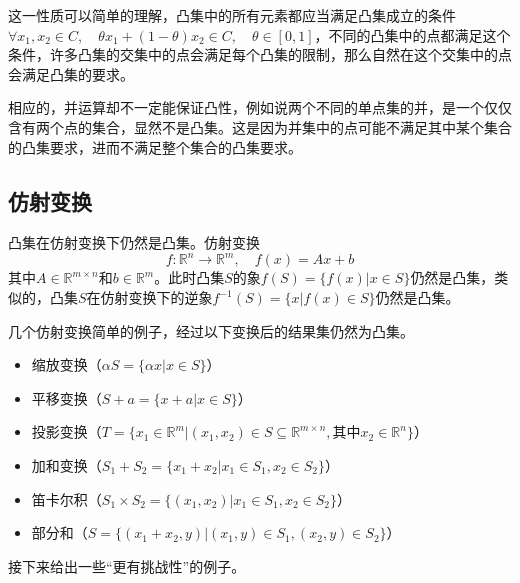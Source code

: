\documentclass[12pt,a4paper]{book}
\begin{document}
这一性质可以简单的理解，凸集中的所有元素都应当满足凸集成立的条件$\forall x_1,x_2 \in C,\quad\theta x_1 + (1 - \theta)x_2 \in C,\quad \theta \in [0,1]$，不同的凸集中的点都满足这个条件，许多凸集的交集中的点会满足每个凸集的限制，那么自然在这个交集中的点会满足凸集的要求。

相应的，并运算却不一定能保证凸性，例如说两个不同的单点集的并，是一个仅仅含有两个点的集合，显然不是凸集。这是因为并集中的点可能不满足其中某个集合的凸集要求，进而不满足整个集合的凸集要求。

\subsection{仿射变换}

凸集在仿射变换下仍然是凸集。仿射变换
$$f:\mathbb{R}^n\to\mathbb{R}^m,\quad f(x)=Ax+b$$
其中$A\in\mathbb{R}^{m \times n}$和$b\in\mathbb{R}^m$。此时凸集$S$的象$f(S) = \{f(x)|x\in S\}$仍然是凸集，类似的，凸集$S$在仿射变换下的逆象$f^{-1}(S) = \{x|f(x)\in S\}$仍然是凸集。

几个仿射变换简单的例子，经过以下变换后的结果集仍然为凸集。

\begin{itemize}
    \item 缩放变换（$\alpha S = \{\alpha x | x\in S\}$）
    \item 平移变换（$ S + a = \{x+a | x\in S\}$）
    \item 投影变换（$T=\{x_1\in\mathbb{R}^m | (x_1,x_2)\in S \subseteq \mathbb{R}^{m\times n},\text{其中}x_2\in \mathbb{R}^n\}$）
    \item 加和变换（$S_1+S_2= \{x_1+x_2 | x_1\in S_1,x_2\in S_2\}$）
    \item 笛卡尔积（$S_1 \times S_2= \{(x_1,x_2) | x_1\in S_1,x_2\in S_2\}$）
    \item 部分和（$S= \{(x_1+x_2,y )| (x_1,y)\in S_1,(x_2,y)\in S_2\}$）
\end{itemize}

接下来给出一些“更有挑战性”的例子。
\end{document}
